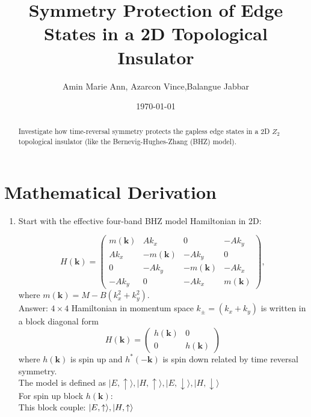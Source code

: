 \documentclass[a4paper,12pt]{article}
\title{Symmetry Protection of Edge States in a 2D Topological Insulator}
\author{Amin Marie Ann, Azarcon Vince,Balangue Jabbar}
\date{\today}
\begin{document}
\maketitle

\begin{abstract}
  Investigate how time-reversal symmetry protects the gapless edge states in a 2D $Z_2$ topological insulator (like the Bernevig-Hughes-Zhang (BHZ) model).
\end{abstract}

\section{Mathematical Derivation}
\begin{enumerate}
    \item Start with the effective four-band BHZ model Hamiltonian in 2D:
    
    \[
    H(\mathbf{k}) = \begin{pmatrix}
    m(\mathbf{k}) & A k_x & 0 & -A k_y \\
    A k_x & -m(\mathbf{k}) & -A k_y & 0 \\
    0 & -A k_y & -m(\mathbf{k}) & -A k_x \\
    -A k_y & 0 & -A k_x & m(\mathbf{k})
    \end{pmatrix},
    \]
    where $m(\mathbf{k}) = M - B(k_x^2 + k_y^2)$.\\
Answer: $4 \times4 $  Hamiltonian in momentum space $k_\pm = (k_x + k_y)$ is written in a block diagonal form\\
\[ H(\mathbf{k}) = \begin{pmatrix}
h(\mathbf{k}) & 0\\
0 & h(\mathbf{k})
\end{pmatrix}\]
where $h(\mathbf{k}) $ is spin up and $h^\ast(\mathbf{-k})$ is spin down related by time reversal  symmetry.\\
The model is defined as
$\vert E, \uparrow \rangle, \vert H, \uparrow \rangle, \vert E, \downarrow \rangle, \vert H, \downarrow \rangle$\\
For spin up block $h(\mathbf{k}):$\\
This block couple: $\vert E, \uparrow \rangle, \vert H, \uparrow \rangle\\$\\


\end{enumerate}
\end{document}
